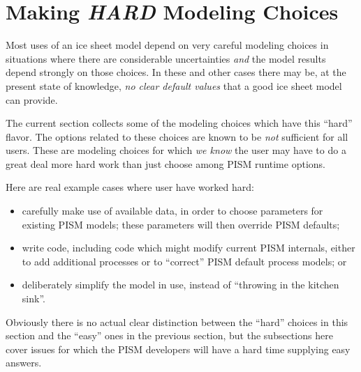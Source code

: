 
\section{Making \emph{HARD} Modeling Choices}
\label{sec:hard-choices}

Most uses of an ice sheet model depend on very careful modeling choices in situations where there are considerable uncertainties \emph{and} the model results depend strongly on those choices.  In these and other cases there may be, at the present state of knowledge, \emph{no clear default values} that a good ice sheet model can provide.

The current section collects some of the modeling choices which have this ``hard'' flavor.  The options related to these choices are known to be \emph{not} sufficient for all users.  These are modeling choices for which \emph{we know} the user may have to do a great deal more hard work than just choose among PISM runtime options.

Here are real example cases where user have worked hard:
\begin{itemize}
\item carefully make use of available data, in order to choose parameters for existing PISM models; these parameters will then override PISM defaults; 
\begin{center} %
\end{center}
\item write code, including code which might modify current PISM internals, either to add additional processes or to ``correct'' PISM default process models; or 
\begin{center} %
\end{center}
\item deliberately simplify the model in use, instead of ``throwing in the kitchen sink''.
\begin{center} %
\end{center}
\end{itemize}
Obviously there is no actual clear distinction between the ``hard'' choices in this section and the ``easy'' ones in the previous section, but the subsections here cover issues for which the PISM developers will have a hard time supplying easy answers.

